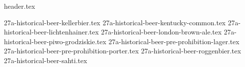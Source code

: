 \clearpage
{}
\divisorLine
{header.tex}
\begin{multicols*}{2}
{27a-historical-beer-kellerbier.tex}
{27a-historical-beer-kentucky-common.tex}
{27a-historical-beer-lichtenhainer.tex}
{27a-historical-beer-london-brown-ale.tex}
{27a-historical-beer-piwo-grodziskie.tex}
{27a-historical-beer-pre-prohibition-lager.tex}
{27a-historical-beer-pre-prohibition-porter.tex}
{27a-historical-beer-roggenbier.tex}
{27a-historical-beer-sahti.tex}
\end{multicols*}
